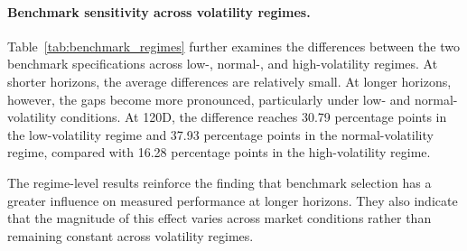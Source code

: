 \documentclass[runningheads,orivec]{llncs}
\begin{document}
\paragraph{Benchmark sensitivity across volatility regimes.} Table~\ref{tab:benchmark_regimes} further examines the differences between the two benchmark specifications across low-, normal-, and high-volatility regimes. At shorter horizons, the average differences are relatively small. At longer horizons, however, the gaps become more pronounced, particularly under low- and normal-volatility conditions. At 120D, the difference reaches 30.79 percentage points in the low-volatility regime and 37.93 percentage points in the normal-volatility regime, compared with 16.28 percentage points in the high-volatility regime.

The regime-level results reinforce the finding that benchmark selection has a greater influence on measured performance at longer horizons. They also indicate that the magnitude of this effect varies across market conditions rather than remaining constant across volatility regimes.
\end{document}
